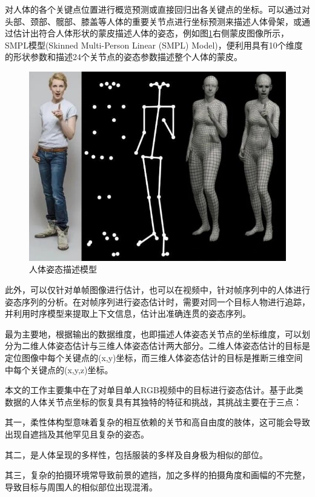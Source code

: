 对人体的各个关键点位置进行概览预测或直接回归出各关键点的坐标。可以通过对头部、颈部、髋部、膝盖等人体的重要关节点进行坐标预测来描述人体骨架，或通过估计出符合人体形状的蒙皮描述人体的姿态，例如图\ref{fig:f4}右侧蒙皮图像所示，SMPL模型(Skinned Multi-Person Linear (SMPL) Model)，便利用具有10个维度的形状参数和描述24个关节点的姿态参数描述整个人体的蒙皮。

\begin{figure}[h]
	\centering
	\includegraphics[scale=0.4]{figures/4.jpg}
	\caption{人体姿态描述模型}
	\label{fig:f4}
\end{figure}

此外，可以仅针对单帧图像进行估计，也可以在视频中，针对帧序列中的人体进行姿态序列的分析。在对帧序列进行姿态估计时，需要对同一个目标人物进行追踪，并利用时序模型来提取上下文信息，估计出准确连贯的姿态序列。

最为主要地，根据输出的数据维度，也即描述人体姿态关节点的坐标维度，可以划分为二维人体姿态估计与三维人体姿态估计两大部分。二维人体姿态估计的目标是定位图像中每个关键点的(x,y)坐标，而三维人体姿态估计的目标是推断三维空间中每个关键点的(x,y,z)坐标。

本文的工作主要集中在了对单目单人RGB视频中的目标进行姿态估计。基于此类数据的人体关节点坐标的恢复具有其独特的特征和挑战，其挑战主要在于三点：

其一，柔性体构型意味着复杂的相互依赖的关节和高自由度的肢体，这可能会导致出现自遮挡及其他罕见且复杂的姿态。

其二，是人体呈现的多样性，包括服装的多样及自身极为相似的部位。

其三，复杂的拍摄环境常导致前景的遮挡，加之多样的拍摄角度和画幅的不完整，导致目标与周围人的相似部位出现混淆。



